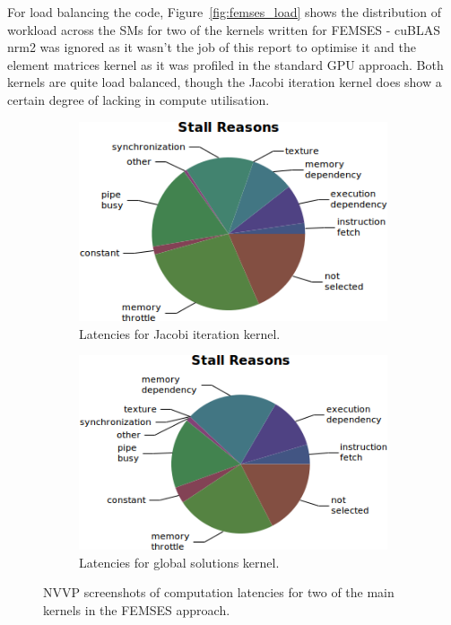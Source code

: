 For load balancing the code, Figure~\ref{fig:femses_load} shows the distribution of workload across the SMs for two of the kernels written for FEMSES - cuBLAS nrm2 was ignored as it wasn't the job of this report to optimise it and the element matrices kernel as it was profiled in the standard GPU approach. Both kernels are quite load balanced, though the Jacobi iteration kernel does show a certain degree of lacking in compute utilisation.

\begin{figure}
	\centering
	\begin{subfigure}{0.43\linewidth}
		\centering
		\includegraphics[width = \linewidth]{Figures/femses_jacobi_instruction_latency}
		\caption{Latencies for Jacobi iteration kernel.}
	\end{subfigure}\hfill
	\begin{subfigure}{0.48\linewidth}
		\centering
		\includegraphics[width=\linewidth]{Figures/femses_glob_instruction_latency}
		\caption{Latencies for global solutions kernel.}
	\end{subfigure}
	\caption{NVVP screenshots of computation latencies for two of the main kernels in the FEMSES approach.}
	\label{fig:femses_latencies}
\end{figure}

